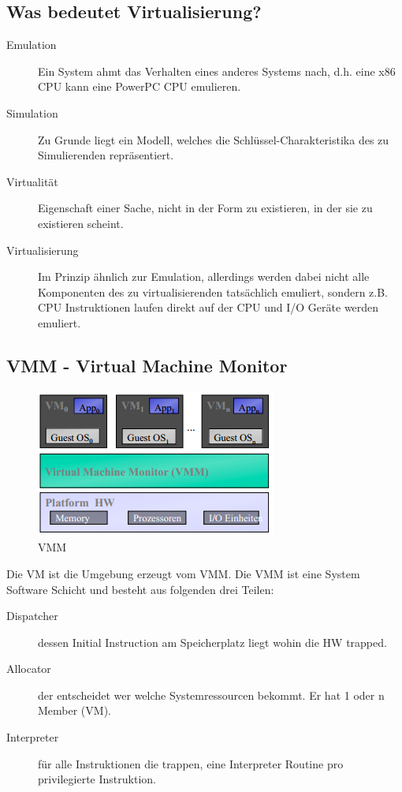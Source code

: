 \subsection{Was bedeutet Virtualisierung?}
\label{sec:was-bedeutet-virtualisierung}
\begin{description}
	\item[Emulation] Ein System ahmt das Verhalten eines anderes Systems nach, d.h. eine x86 CPU kann eine PowerPC CPU emulieren.
	\item[Simulation] Zu Grunde liegt ein Modell, welches die Schlüssel-Charakteristika des zu Simulierenden repräsentiert.
	\item[Virtualität] Eigenschaft einer Sache, nicht in der Form zu existieren, in der sie zu existieren scheint.
	\item[Virtualisierung] Im Prinzip ähnlich zur Emulation, allerdings werden dabei nicht alle Komponenten des zu virtualisierenden tatsächlich emuliert, sondern z.B. CPU Instruktionen laufen direkt auf der CPU und I/O Geräte werden emuliert.
\end{description}

\subsection{VMM - Virtual Machine Monitor}
\label{sec:vmm-virtual-machine-monitor}
\begin{figure}[h!]
	\centering
	\includegraphics[width=0.4\linewidth]{fig/vmm}
	\caption{VMM}
	\label{fig:vmm}
\end{figure}
Die VM ist die Umgebung erzeugt vom VMM. Die VMM ist eine System Software Schicht und besteht aus folgenden drei Teilen:
\begin{description}
	\item[Dispatcher] dessen Initial Instruction am Speicherplatz liegt wohin die HW trapped.
	\item[Allocator] der entscheidet wer welche Systemressourcen bekommt. Er hat 1 oder n Member (VM).
	\item[Interpreter] für alle Instruktionen die trappen, eine Interpreter Routine pro privilegierte Instruktion.
\end{description}

